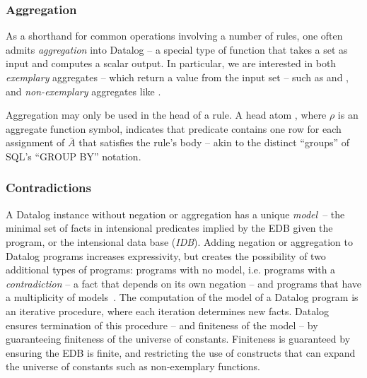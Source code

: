 \subsubsection{Aggregation}

As a shorthand for common operations involving a number of rules, one often
admits {\em aggregation} into Datalog -- a special type of function that takes
a set as input and computes a scalar output.  In particular, we are interested
in both {\em exemplary} aggregates -- which return a value from the input set
-- such as  and , and {\em non-exemplary} aggregates
like .

Aggregation may only be used in the head of a rule.  A head atom
, where $\rho$ is an aggregate function symbol,
indicates that predicate  contains one row for each assignment of
$\bar{A}$ that satisfies the rule's body -- akin to the distinct ``groups'' of
SQL's ``GROUP BY'' notation.

\subsubsection{Contradictions}

A Datalog instance without negation or aggregation has a unique {\em
model}~\cite{ullmanbook}-- the minimal set of facts in intensional predicates
implied by the EDB given the program, or the intensional data base ({\em IDB}).
Adding negation or aggregation to Datalog programs increases expressivity, but
creates the possibility of two additional types of programs: programs with no
model, i.e. programs with a {\em contradiction} -- a fact that depends on its
own negation -- and programs that have a multiplicity of
models~\cite{sacca-zaniolo}.  The computation of the model of a Datalog program
is an iterative procedure, where each iteration determines new facts.  Datalog
ensures termination of this procedure -- and finiteness of the model -- by
guaranteeing finiteness of the universe of constants.  Finiteness is guaranteed
by ensuring the EDB is finite, and restricting the use of constructs that can
expand the universe of constants such as non-exemplary functions.

